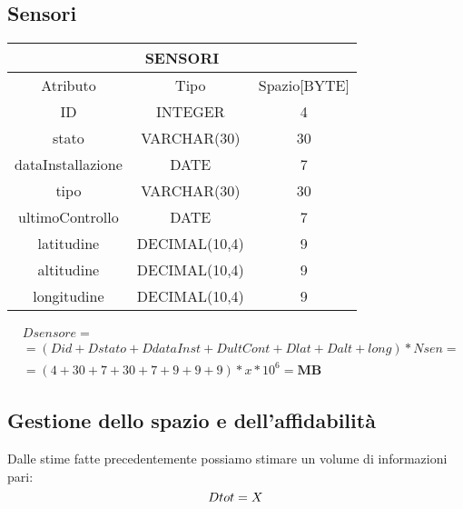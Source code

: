 \subsection{Sensori}
\begin{tabular}{ |c|c|c|}
  \hline
  \multicolumn{3}{|c|}{\textbf{SENSORI}}\\
  \hline
  Atributo & Tipo & Spazio[BYTE] \\
  \hline
  ID & INTEGER & 4 \\
  stato & VARCHAR(30) & 30\\
  dataInstallazione & DATE & 7\\
  tipo & VARCHAR(30) & 30\\
  ultimoControllo & DATE & 7\\
  latitudine & DECIMAL(10,4) & 9\\
  altitudine & DECIMAL(10,4) & 9\\
  longitudine & DECIMAL(10,4) & 9\\
  \hline
\end{tabular}
\begin{equation}
  \begin{aligned}
    &Dsensore =\\
    &=(Did+Dstato+DdataInst+DultCont+Dlat+Dalt+long)*Nsen=\\
    &=(4+30+7+30+7+9+9+9)*x*10^6= \textbf{MB}
  \end{aligned}
\end{equation}
\subsection{Gestione dello spazio e dell'affidabilità}
Dalle stime fatte precedentemente possiamo stimare un volume di informazioni pari:
\begin{equation}
  Dtot=X\\
\end{equation}
